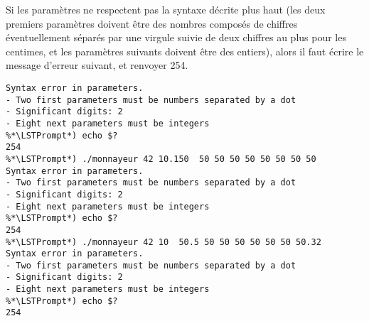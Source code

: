 \bigskip

%
%

\noindent Si les paramètres ne respectent pas la syntaxe décrite plus haut (les deux premiers paramètres doivent être des nombres composés de chiffres éventuellement séparés par une virgule suivie de deux chiffres au plus pour les centimes, et les paramètres suivants doivent être des entiers), alors il faut écrire le message d'erreur suivant, et renvoyer 254.

\bigskip

\noindent {}

\noindent {}

\noindent {}

\noindent {}

\bigskip

\begin{lstlisting}[frame=single,title={Cas d'erreur 2 (C et Python)}]
%*\LSTPrompt*) ./monnayeur 42,1 10  50 50 50 50 50 50 50 50
Syntax error in parameters.
- Two first parameters must be numbers separated by a dot
- Significant digits: 2
- Eight next parameters must be integers
%*\LSTPrompt*) echo $?
254
%*\LSTPrompt*) ./monnayeur 42 10.150  50 50 50 50 50 50 50 50
Syntax error in parameters.
- Two first parameters must be numbers separated by a dot
- Significant digits: 2
- Eight next parameters must be integers
%*\LSTPrompt*) echo $?
254
%*\LSTPrompt*) ./monnayeur 42 10  50.5 50 50 50 50 50 50 50.32
Syntax error in parameters.
- Two first parameters must be numbers separated by a dot
- Significant digits: 2
- Eight next parameters must be integers
%*\LSTPrompt*) echo $?
254
\end{lstlisting}

